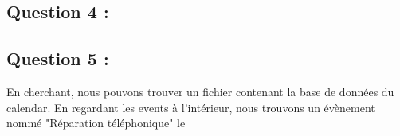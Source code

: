\documentclass{article}
\begin{document}
    \subsection{Question 4 :}
        
    \subsection{Question 5 :}
        En cherchant, nous pouvons trouver un fichier contenant la base de données du calendar.
        En regardant les events à l'intérieur, nous trouvons un évènement nommé "Réparation téléphonique" le  
\end{document}
